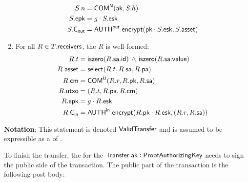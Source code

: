 \begin{definition}
\begin{enumerate}
\begin{align*}
                S.n      &= {\textsf{COM}}^{\textsf{N}}({\textsf{ak}}, S.h) \\
                S.{\textsf{epk}}   &= g \cdot S.{\textsf{esk}} \\
                S.{\textsf{C}_\textsf{out}}  &= {{\textsf{AUTH}}^\textsf{out}}.{\textsf{encrypt}}({\textsf{pk}} \cdot S.{\textsf{esk}}, S.{\textsf{asset}})
            \end{align*}
        \item For all $R \in T.{\textsf{receivers}}$, the \Receiver{} $R$ is well-formed:
            \begin{align*}
                R.t      &= {\textsf{iszero}}(R.{\textsf{sa}}.{\textsf{id}}) \,\wedge\, {\textsf{iszero}}(R.{\textsf{sa}}.{\textsf{value}}) \\
                R.{\textsf{asset}} &= {\textsf{select}}(R.t, R.{\textsf{sa}}, R.{\textsf{pa}}) \\
                R.{\textsf{cm}}    &= {\textsf{COM}}^{{\textsf{U}}}(R.r, R.{\textsf{pk}}, R.{\textsf{sa}}) \\
                R.{\textsf{utxo}}  &= (R.t, R.{\textsf{pa}}, R.{\textsf{cm}}) \\
                R.{\textsf{epk}}   &= g \cdot R.{\textsf{esk}} \\
                R.{\textsf{C}_\textsf{in}}   &= {{\textsf{AUTH}}^\textsf{in}}.{\textsf{encrypt}}(R.{\textsf{pk}} \cdot R.{\textsf{esk}}, (R.r, R.{\textsf{sa}}))
            \end{align*}
    \end{enumerate}
    \textbf{Notation}: This statement is denoted ${\textsf{ValidTransfer}}$ and is assumed to be expressible as a \Statement{} of \NIZK{}.
\end{definition}

To finish the transfer, the \SpendingKey{} for the ${\textsf{Transfer}}.{\textsf{ak}} : {\textsf{ProofAuthorizingKey}}$ needs to sign the public side of the transaction. The public part of the transaction is the following post body:

